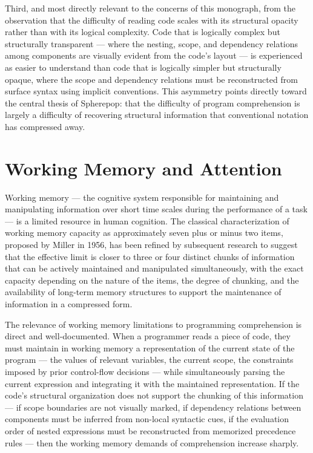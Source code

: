 \documentclass[12pt,openany]{book}
\theoremstyle{plain}
\theoremstyle{definition}
\theoremstyle{remark}
\begin{document}
Third, and most directly relevant to the concerns of this monograph, from the observation that the difficulty of reading code scales with its structural opacity rather than with its logical complexity. Code that is logically complex but structurally transparent — where the nesting, scope, and dependency relations among components are visually evident from the code's layout — is experienced as easier to understand than code that is logically simpler but structurally opaque, where the scope and dependency relations must be reconstructed from surface syntax using implicit conventions. This asymmetry points directly toward the central thesis of Spherepop: that the difficulty of program comprehension is largely a difficulty of recovering structural information that conventional notation has compressed away.

\section{Working Memory and Attention}

Working memory — the cognitive system responsible for maintaining and manipulating information over short time scales during the performance of a task — is a limited resource in human cognition. The classical characterization of working memory capacity as approximately seven plus or minus two items, proposed by Miller in 1956, has been refined by subsequent research to suggest that the effective limit is closer to three or four distinct chunks of information that can be actively maintained and manipulated simultaneously, with the exact capacity depending on the nature of the items, the degree of chunking, and the availability of long-term memory structures to support the maintenance of information in a compressed form.

The relevance of working memory limitations to programming comprehension is direct and well-documented. When a programmer reads a piece of code, they must maintain in working memory a representation of the current state of the program — the values of relevant variables, the current scope, the constraints imposed by prior control-flow decisions — while simultaneously parsing the current expression and integrating it with the maintained representation. If the code's structural organization does not support the chunking of this information — if scope boundaries are not visually marked, if dependency relations between components must be inferred from non-local syntactic cues, if the evaluation order of nested expressions must be reconstructed from memorized precedence rules — then the working memory demands of comprehension increase sharply.
\end{document}
